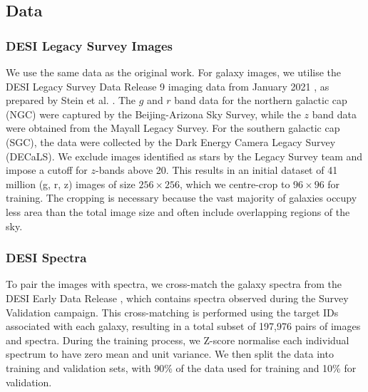 \documentclass[a4paper,12pt]{article}
\begin{document}
\subsection{Data}
\label{sec:data}
\subsubsection{DESI Legacy Survey Images}
We use the same data as the original work. For galaxy images, we utilise the DESI Legacy Survey Data Release 9 imaging data from January 2021 \cite{DESI}, as prepared by Stein et al. \cite{stein}. The $g$ and $r$ band data for the northern galactic cap (NGC) were captured by the Beijing-Arizona Sky Survey, while the $z$ band data were obtained from the Mayall Legacy Survey. For the southern galactic cap (SGC), the data were collected by the Dark Energy Camera Legacy Survey (DECaLS). We exclude images identified as stars by the Legacy Survey team and impose a cutoff for $z$-bands above 20. This results in an initial dataset of 41 million (g, r, z) images of size $256 \times 256$, which we centre-crop to $96 \times 96$ for training. The cropping is necessary because the vast majority of galaxies occupy less area than the total image size and often include overlapping regions of the sky.


\subsubsection{DESI Spectra}
To pair the images with spectra, we cross-match the galaxy spectra from the DESI Early Data Release \cite{DESI2023}, which contains spectra observed during the Survey Validation campaign. This cross-matching is performed using the target IDs associated with each galaxy, resulting in a total subset of 197,976 pairs of images and spectra. During the training process, we Z-score normalise each individual spectrum to have zero mean and unit variance. We then split the data into training and validation sets, with 90\% of the data used for training and 10\% for validation.
\end{document}
